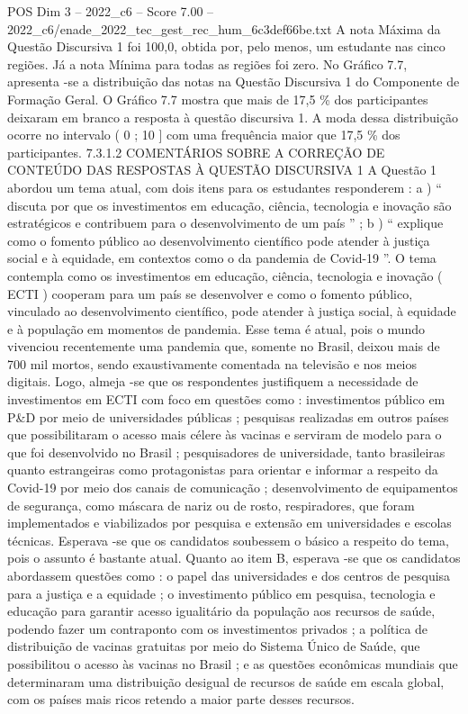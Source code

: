 \begin{textsample}{POS Dim 3 – 2022\_c6 – Score 7.00 – 2022\_c6/enade\_2022\_tec\_gest\_rec\_hum\_6c3def66be.txt}
A nota Máxima da Questão Discursiva 1 foi 100,0, obtida por, pelo menos, um estudante nas cinco regiões.
Já a nota Mínima para todas as regiões foi zero.
No Gráfico 7.7, apresenta -se a distribuição das notas na Questão Discursiva 1 do Componente de Formação Geral.
O Gráfico 7.7 mostra que mais de 17,5 \% dos participantes deixaram em branco a resposta à questão discursiva 1.
A moda dessa distribuição ocorre no intervalo ( 0 ; 10 ] com uma frequência maior que 17,5 \% dos participantes. 7.3.1.2 COMENTÁRIOS SOBRE A CORREÇÃO DE CONTEÚDO DAS RESPOSTAS À QUESTÃO DISCURSIVA 1 A Questão 1 abordou um tema atual, com dois itens para os estudantes responderem : a ) “ discuta por que os investimentos em educação, ciência, tecnologia e inovação são estratégicos e contribuem para o desenvolvimento de um país ” ; b ) “ explique como o fomento público ao desenvolvimento científico pode atender à justiça social e à equidade, em contextos como o da pandemia de Covid-19 ”.
O tema contempla como os investimentos em educação, ciência, tecnologia e inovação ( ECTI ) cooperam para um país se desenvolver e como o fomento público, vinculado ao desenvolvimento científico, pode atender à justiça social, à equidade e à população em momentos de pandemia.
Esse tema é atual, pois o mundo vivenciou recentemente uma pandemia que, somente no Brasil, deixou mais de 700 mil mortos, sendo exaustivamente comentada na televisão e nos meios digitais.
Logo, almeja -se que os respondentes justifiquem a necessidade de investimentos em ECTI com foco em questões como : investimentos público em P\&D por meio de universidades públicas ; pesquisas realizadas em outros países que possibilitaram o acesso mais célere às vacinas e serviram de modelo para o que foi desenvolvido no Brasil ; pesquisadores de universidade, tanto brasileiras quanto estrangeiras como protagonistas para orientar e informar a respeito da Covid-19 por meio dos canais de comunicação ; desenvolvimento de equipamentos de segurança, como máscara de nariz ou de rosto, respiradores, que foram implementados e viabilizados por pesquisa e extensão em universidades e escolas técnicas.
Esperava -se que os candidatos soubessem o básico a respeito do tema, pois o assunto é bastante atual.
Quanto ao item B, esperava -se que os candidatos abordassem questões como : o papel das universidades e dos centros de pesquisa para a justiça e a equidade ; o investimento público em pesquisa, tecnologia e educação para garantir acesso igualitário da população aos recursos de saúde, podendo fazer um contraponto com os investimentos privados ; a política de distribuição de vacinas gratuitas por meio do Sistema Único de Saúde, que possibilitou o acesso às vacinas no Brasil ; e as questões econômicas mundiais que determinaram uma distribuição desigual de recursos de saúde em escala global, com os países mais ricos retendo a maior parte desses recursos.

\end{textsample}
